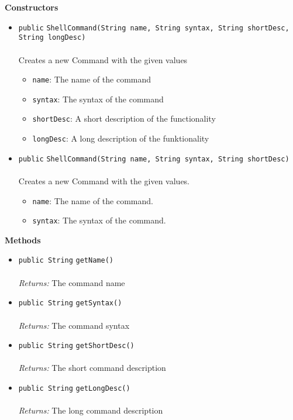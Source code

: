 \textbf{\sffamily Constructors}
\begin{itemize}
\item \lstinline|public| \lstinline|ShellCommand|\lstinline|(String name, String syntax, String shortDesc, String longDesc)|\\ \\[-0.6em]
Creates a new Command with the given values
\begin{itemize}
\item \lstinline|name|: The name of the command
\item \lstinline|syntax|: The syntax of the command
\item \lstinline|shortDesc|: A short description of the functionality
\item \lstinline|longDesc|: A long description of the funktionality
\end{itemize}



\item \lstinline|public| \lstinline|ShellCommand|\lstinline|(String name, String syntax, String shortDesc)|\\ \\[-0.6em]
Creates a new Command with the given values.
\begin{itemize}
\item \lstinline|name|: The name of the command.
\item \lstinline|syntax|: The syntax of the command.
\end{itemize}



\end{itemize}


\textbf{\sffamily Methods}
\begin{itemize}
\item \lstinline|public String| \lstinline|getName|\lstinline|()|\\ \\[-0.6em]
\emph{Returns:} The command name



\item \lstinline|public String| \lstinline|getSyntax|\lstinline|()|\\ \\[-0.6em]
\emph{Returns:} The command syntax



\item \lstinline|public String| \lstinline|getShortDesc|\lstinline|()|\\ \\[-0.6em]
\emph{Returns:} The short command description



\item \lstinline|public String| \lstinline|getLongDesc|\lstinline|()|\\ \\[-0.6em]
\emph{Returns:} The long command description



\end{itemize}

